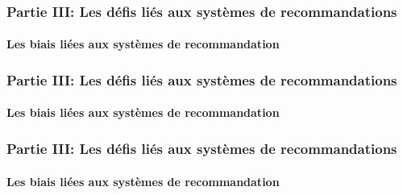 \begin{frame}

    \frametitle{Partie III: Les défis liés aux systèmes de recommandations}
    \framesubtitle{Les biais liées aux systèmes de recommandation}

    \begin{figure}
        \centering
    \end{figure}

\end{frame}

\begin{frame}

    \frametitle{Partie III: Les défis liés aux systèmes de recommandations}
    \framesubtitle{Les biais liées aux systèmes de recommandation}

    \begin{figure}
        \centering
    \end{figure}

\end{frame}

\begin{frame}

    \frametitle{Partie III: Les défis liés aux systèmes de recommandations}
    \framesubtitle{Les biais liées aux systèmes de recommandation}

    \begin{figure}
        \centering
    \end{figure}

\end{frame}

